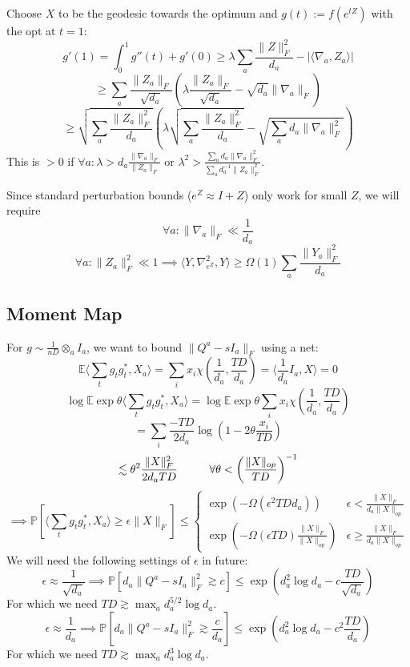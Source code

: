 \documentclass{article}
\newcommand{\E}{\mathbb{E}}
\renewcommand{\Pr}{\mathbb{P}}
\begin{document}
Choose $X$ to be the geodesic towards the optimum and $g(t) := f(e^{tZ})$ with the opt at $t=1$:
\[ g'(1) = \int_{0}^{1} g''(t) + g'(0) \geq \lambda \sum_{a} \frac{\|Z\|_{F}^{2}}{d_{a}} - |\langle \nabla_{a}, Z_{a} \rangle| \]
\[ \geq \sum_{a} \frac{\|Z_{a}\|_{F}}{\sqrt{d_{a}}} \left( \lambda \frac{\|Z_{a}\|_{F}}{\sqrt{d_{a}}} - \sqrt{d_{a}} \|\nabla_{a}\|_{F}  \right)  \]
\[ \geq \sqrt{\sum_{a} \frac{\|Z_{a}\|_{F}^{2}}{d_{a}}} \left( \lambda \sqrt{\sum_{a} \frac{\|Z_{a}\|_{F}^{2}}{d_{a}}} - \sqrt{\sum_{a} d_{a} \|\nabla_{a}\|_{F}^{2}} \right)  \]
This is $> 0$ if $\forall a: \lambda > d_{a} \frac{\|\nabla_{a}\|_{F}}{\|Z_{a}\|_{F}}$ or $\lambda^{2} > \frac{ \sum_{a} d_{a} \|\nabla_{a}\|_{F}^{2} }{\sum_{a} d_{a}^{-1} \|Z_{a}\|_{F}^{2}} $.

Since standard perturbation bounds ($e^{Z} \approx I + Z$) only work for small $Z$, we will require
\[ \forall a: \|\nabla_{a}\|_{F} \ll \frac{1}{d_{a}} \]
\[ \forall a: \|Z_{a}\|_{F}^{2} \ll 1 \implies \langle Y, \nabla_{e^{Z}}^{2}, Y \rangle \geq \Omega(1) \sum_{a} \frac{\|Y_{a}\|_{F}^{2}}{d_{a}}   \]


\subsection{Moment Map}
For $g \sim \frac{1}{nD} \otimes_{a} I_{a}$, we want to bound $\|Q^{a} - sI_{a}\|_{F}$ using a net:
\[ \E \langle \sum_{t} g_{t} g_{t}^{*}, X_{a} \rangle = \sum_{i} x_{i} \chi(\frac{1}{d_{a}}, \frac{TD}{d_{a}}) = \langle \frac{1}{d_{a}} I_{a}, X \rangle = 0 \]
\[ \log \E \exp \theta \langle \sum_{t} g_{t} g_{t}^{*}, X_{a} \rangle = \log \E \exp \theta \sum_{i} x_{i} \chi(\frac{1}{d_{a}}, \frac{TD}{d_{a}})  \]
\[ = \sum_{i} \frac{-TD}{2 d_{a}} \log \left( 1 - 2 \theta \frac{x_{i}}{TD} \right)   \]
\[ \lesssim \theta^{2} \frac{\|X\|_{F}^{2}}{2 d_{a} TD} \hspace{10mm} \forall \theta < \left( \frac{\|X\|_{op}}{TD} \right)^{-1}  \]
\[ \implies \Pr[ \langle \sum_{t} g_{t} g_{t}^{*}, X_{a} \rangle \geq \epsilon \|X\|_{F} ] \leq
\begin{cases}
\exp( - \Omega(\epsilon^{2} TD d_{a}) ) & \epsilon  < \frac{\|X\|_{F}}{d_{a} \|X\|_{op}}
\\ \exp ( - \Omega(\epsilon TD) \frac{\|X\|_{F}}{\|X\|_{op}} ) & \epsilon \geq \frac{\|X\|_{F}}{d_{a} \|X\|_{op}}
\end{cases}
\]
We will need the following settings of $\epsilon$ in future:
\[ \epsilon \approx \frac{1}{\sqrt{d_{a}}} \implies \Pr [ d_{a} \|Q^{a} - sI_{a}\|_{F}^{2} \gtrsim c ] \leq \exp(d_{a}^{2} \log d_{a} - c \frac{TD}{\sqrt{d_{a}}})  \]
For which we need $TD \gtrsim \max_{a} d_{a}^{5/2} \log d_{a}$.
\[ \epsilon \approx \frac{1}{d_{a}} \implies \Pr [ d_{a} \|Q^{a} - sI_{a}\|_{F}^{2} \gtrsim \frac{c}{d_{a}} ] \leq \exp(d_{a}^{2} \log d_{a} - c^{2} \frac{TD}{d_{a}})   \]
For which we need $TD \gtrsim \max_{a} d_{a}^{3} \log d_{a}$.
\end{document}
